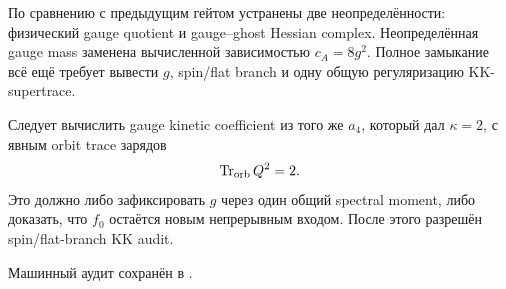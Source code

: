 \begin{theorem}
По сравнению с предыдущим гейтом устранены две неопределённости:
физический gauge quotient и gauge--ghost Hessian complex. Неопределённая
gauge mass заменена вычисленной зависимостью \(c_A=8g^2\). Полное
замыкание всё ещё требует вывести \(g\), spin/flat branch и одну общую
регуляризацию KK-supertrace.
\end{theorem}

\begin{protocol}
Следует вычислить gauge kinetic coefficient из того же \(a_4\), который
дал \(\kappa=2\), с явным orbit trace зарядов
\begin{equation}
 \operatorname{Tr}_{\mathrm{orb}}Q^2=2.
\end{equation}
Это должно либо зафиксировать \(g\) через один общий spectral moment, либо
доказать, что \(f_0\) остаётся новым непрерывным входом. После этого
разрешён spin/flat-branch KK audit.
\end{protocol}

Машинный аудит сохранён в
.